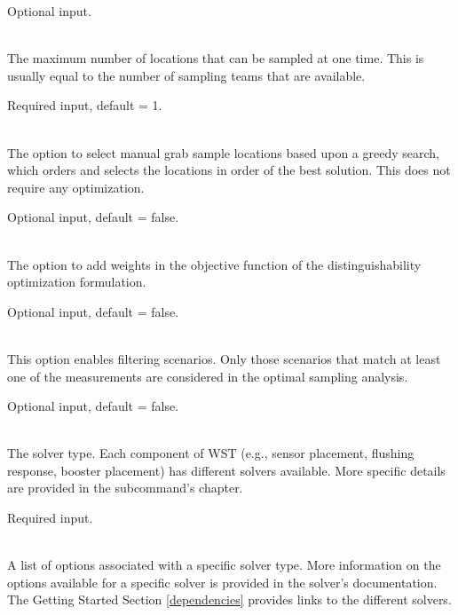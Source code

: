 \begin{description}[topsep=0pt,parsep=0.5em,itemsep=-0.4em]
\begin{description}[topsep=0pt,parsep=0.5em,itemsep=-0.4em]
                Optional input.
    \item[{num samples}]\hfill
\\The maximum number of locations that can be sampled at one time. This is usually equal
                to the number of sampling teams that are available.

                Required input, default = 1.
    \item[{greedy selection}]\hfill
\\The option to select manual grab sample locations based upon a greedy search, which orders and selects the locations in order of the best solution.
                This does not require any optimization.

                Optional input, default = false.
    \item[{with weights}]\hfill
\\The option to add weights in the objective function of the distinguishability 
                optimization formulation.

                Optional input, default = false.
    \item[{filter scenarios}]\hfill
\\ This option enables filtering scenarios. Only those scenarios 
                that match at least one of the measurements are considered
                in the optimal sampling analysis.
				
				Optional input, default = false.
  \end{description}
  \item[{solver}]\hfill
  \begin{description}[topsep=0pt,parsep=0.5em,itemsep=-0.4em]
    \item[{type}]\hfill
\\The solver type. Each component of WST
				(e.g., sensor placement, flushing response, booster 
				placement) has different 
				solvers available. More specific details are provided in 
				the subcommand's chapter.
                
                Required input.
    \item[{options}]\hfill
\\A list of options associated with a specific solver type. More
            information on the options available for a specific solver
            is provided in the solver's documentation. The Getting
            Started Section \ref{dependencies} provides links to the
            different solvers.
            

\end{description}
\end{description}
